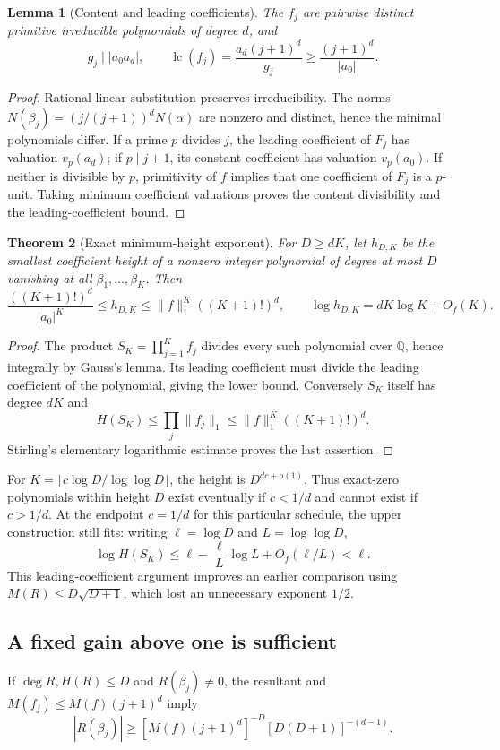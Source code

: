 \documentclass[11pt,a4paper]{article}
\newcommand{\Q}{\mathbb Q}
\newtheorem{theorem}{Theorem}[section]
\newtheorem{lemma}[theorem]{Lemma}
\theoremstyle{definition}
\theoremstyle{remark}
\numberwithin{equation}{section}
\begin{document}
\begin{lemma}[Content and leading coefficients]\label{inf:lem:orbit-content}
The $f_j$ are pairwise distinct primitive irreducible polynomials of degree $d$, and
\[
 g_j\mid |a_0a_d|,\qquad
 \operatorname{lc}(f_j)=\frac{a_d(j+1)^d}{g_j}
                  \ge\frac{(j+1)^d}{|a_0|}.
\]
\end{lemma}
\begin{proof}
Rational linear substitution preserves irreducibility. The norms
$N(\beta_j)=(j/(j+1))^dN(\alpha)$ are nonzero and distinct, hence the minimal polynomials differ. If a prime $p$ divides $j$, the leading coefficient of $F_j$ has valuation $v_p(a_d)$; if $p\mid j+1$, its constant coefficient has valuation $v_p(a_0)$. If neither is divisible by $p$, primitivity of $f$ implies that one coefficient of $F_j$ is a $p$-unit. Taking minimum coefficient valuations proves the content divisibility and the leading-coefficient bound.
\end{proof}

\begin{theorem}[Exact minimum-height exponent]\label{inf:thm:orbit-height}
For $D\ge dK$, let $h_{D,K}$ be the smallest coefficient height of a nonzero integer polynomial of degree at most $D$ vanishing at all $\beta_1,\ldots,\beta_K$. Then
\[
 \frac{((K+1)!)^d}{|a_0|^K}
 \le h_{D,K}\le\|f\|_1^K((K+1)!)^d,
 \qquad \log h_{D,K}=dK\log K+O_f(K).
\]
\end{theorem}
\begin{proof}
The product $S_K=\prod_{j=1}^Kf_j$ divides every such polynomial over $\Q$, hence integrally by Gauss's lemma. Its leading coefficient must divide the leading coefficient of the polynomial, giving the lower bound. Conversely $S_K$ itself has degree $dK$ and
\[
 H(S_K)\le\prod_j\|f_j\|_1\le\|f\|_1^K((K+1)!)^d.
\]
Stirling's elementary logarithmic estimate proves the last assertion.
\end{proof}

For $K=\lfloor c\log D/\log\log D\rfloor$, the height is $D^{dc+o(1)}$. Thus exact-zero polynomials within height $D$ exist eventually if $c<1/d$ and cannot exist if $c>1/d$. At the endpoint $c=1/d$ for this particular schedule, the upper construction still fits: writing $\ell=\log D$ and $L=\log\log D$,
\[
 \log H(S_K)\le\ell-\frac\ell L\log L+O_f(\ell/L)<\ell.
\]
This leading-coefficient argument improves an earlier comparison using $M(R)\le D\sqrt{D+1}$, which lost an unnecessary exponent $1/2$.

\subsection{A fixed gain above one is sufficient}
\label{inf:sub:kappa}
If $\deg R,H(R)\le D$ and $R(\beta_j)\ne0$, the resultant and
$M(f_j)\le M(f)(j+1)^d$ imply
\begin{equation}\label{inf:eq:orbit-resultant}
 |R(\beta_j)|\ge[M(f)(j+1)^d]^{-D}[D(D+1)]^{-(d-1)}.
\end{equation}
\end{document}
